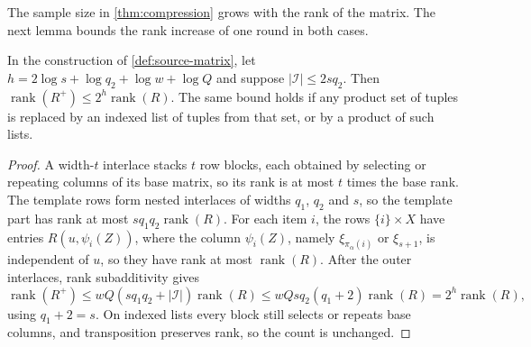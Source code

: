 \documentclass[11pt,letterpaper]{article} \usepackage[utf8]{inputenc}
\theoremstyle{plain} \newtheorem{theorem}{Theorem}[section]
\theoremstyle{definition} \newaliascnt{definition}{theorem}
\DeclareMathOperator{\rank}{rank} \crefname{claim}{Claim}{Claims}
\begin{document}
The sample size in \cref{thm:compression} grows with the rank of the matrix.
The next lemma bounds the rank increase of one round in both cases.

\begin{lemma}\label{lem:amplifier-rank}
In the construction of \cref{def:source-matrix}, let
$h=2\log s+\log q_2+\log w+\log Q$ and suppose
$|\mathcal I|\le2sq_2$. Then $\rank(R^+)\le2^h\rank(R)$.
The same bound holds if any product set of tuples is replaced by an
indexed list of tuples from that set, or by a product of such lists.
\end{lemma}
\begin{proof}
A width-$t$ interlace stacks $t$ row blocks, each obtained by selecting or
repeating columns of its base matrix, so its rank is at most $t$ times the
base rank.
The template rows form nested interlaces of widths $q_1$, $q_2$ and $s$,
so the template part has rank at most $sq_1q_2\rank(R)$.
For each item $i$, the rows $\{i\}\times X$ have entries $R(u,\psi_i(Z))$, where
the column $\psi_i(Z)$, namely $\xi_{\pi_\alpha(i)}$ or $\xi_{s+1}$, is independent of $u$, so
they have rank at most $\rank(R)$.
After the outer interlaces, rank subadditivity gives
\[
\rank(R^+)\le wQ(sq_1q_2+|\mathcal I|)\rank(R)
\le wQsq_2(q_1+2)\rank(R)=2^h\rank(R),
\]
using $q_1+2=s$. On indexed lists every block still selects or repeats
base columns, and transposition preserves rank, so the count is unchanged.
\end{proof}
\end{document}
